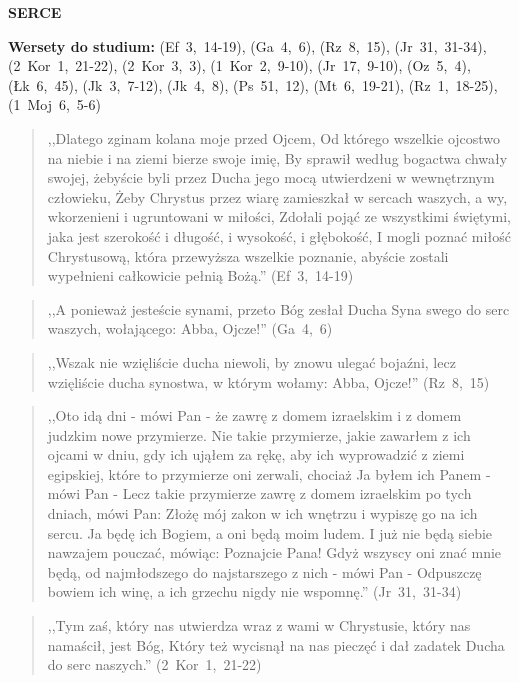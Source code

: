 \documentclass[10pt,a4paper,oneside]{article}
\begin{document}
\centerline{\textbf{\MakeUppercase{Serce}}}
\begin{center}
\textbf{Wersety do studium:} \mbox{(Ef 3, 14-19)}, \mbox{(Ga 4, 6)}, \mbox{(Rz 8, 15)}, \mbox{(Jr 31, 31-34)}, \mbox{(2 Kor 1, 21-22)}, \mbox{(2 Kor 3, 3)}, \mbox{(1 Kor 2, 9-10)}, \mbox{(Jr 17, 9-10)}, \mbox{(Oz 5, 4)}, \mbox{(Łk 6, 45)}, \mbox{(Jk 3, 7-12)}, \mbox{(Jk 4, 8)}, \mbox{(Ps 51, 12)}, \mbox{(Mt 6, 19-21)}, \mbox{(Rz 1, 18-25)}, \mbox{(1 Moj 6, 5-6)}
\end{center}
\begin{quote}
,,Dlatego zginam kolana moje przed Ojcem, Od którego wszelkie ojcostwo na niebie i na ziemi bierze swoje imię, By sprawił według bogactwa chwały swojej, żebyście byli przez Ducha jego mocą utwierdzeni w wewnętrznym człowieku, Żeby Chrystus przez wiarę zamieszkał w sercach waszych, a wy, wkorzenieni i ugruntowani w miłości, Zdołali pojąć ze wszystkimi świętymi, jaka jest szerokość i długość, i wysokość, i głębokość, I mogli poznać miłość Chrystusową, która przewyższa wszelkie poznanie, abyście zostali wypełnieni całkowicie pełnią Bożą.'' \mbox{(Ef 3, 14-19)}
\end{quote}
\begin{quote}
,,A ponieważ jesteście synami, przeto Bóg zesłał Ducha Syna swego do serc waszych, wołającego: Abba, Ojcze!'' \mbox{(Ga 4, 6)}
\end{quote}
\begin{quote}
,,Wszak nie wzięliście ducha niewoli, by znowu ulegać bojaźni, lecz wzięliście ducha synostwa, w którym wołamy: Abba, Ojcze!'' \mbox{(Rz 8, 15)}
\end{quote}
\begin{quote}
,,Oto idą dni - mówi Pan - że zawrę z domem izraelskim i z domem judzkim nowe przymierze. Nie takie przymierze, jakie zawarłem z ich ojcami w dniu, gdy ich ująłem za rękę, aby ich wyprowadzić z ziemi egipskiej, które to przymierze oni zerwali, chociaż Ja byłem ich Panem - mówi Pan - Lecz takie przymierze zawrę z domem izraelskim po tych dniach, mówi Pan: Złożę mój zakon w ich wnętrzu i wypiszę go na ich sercu. Ja będę ich Bogiem, a oni będą moim ludem. I już nie będą siebie nawzajem pouczać, mówiąc: Poznajcie Pana! Gdyż wszyscy oni znać mnie będą, od najmłodszego do najstarszego z nich - mówi Pan - Odpuszczę bowiem ich winę, a ich grzechu nigdy nie wspomnę.'' \mbox{(Jr 31, 31-34)}
\end{quote}
\begin{quote}
,,Tym zaś, który nas utwierdza wraz z wami w Chrystusie, który nas namaścił, jest Bóg, Który też wycisnął na nas pieczęć i dał zadatek Ducha do serc naszych.'' \mbox{(2 Kor 1, 21-22)}
\end{quote}
\end{document}
